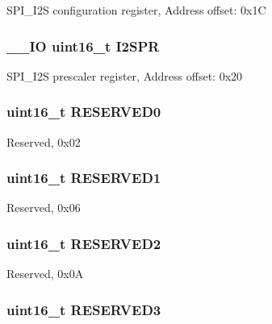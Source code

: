 S\-P\-I\-\_\-\-I2\-S configuration register, Address offset\-: 0x1\-C \hypertarget{struct_s_p_i___type_def_a02ce1ece243cc4ce1d66ebeca247fee1}{
\subsubsection[{I2\-S\-P\-R}]{\setlength{\rightskip}{0pt plus 5cm}\-\_\-\-\_\-\-I\-O uint16\-\_\-t I2\-S\-P\-R}}\label{struct_s_p_i___type_def_a02ce1ece243cc4ce1d66ebeca247fee1}
S\-P\-I\-\_\-\-I2\-S prescaler register, Address offset\-: 0x20 \hypertarget{struct_s_p_i___type_def_a149feba01f9c4a49570c6d88619f504f}{
\subsubsection[{R\-E\-S\-E\-R\-V\-E\-D0}]{\setlength{\rightskip}{0pt plus 5cm}uint16\-\_\-t R\-E\-S\-E\-R\-V\-E\-D0}}\label{struct_s_p_i___type_def_a149feba01f9c4a49570c6d88619f504f}
Reserved, 0x02 \hypertarget{struct_s_p_i___type_def_a8249a3955aace28d92109b391311eb30}{
\subsubsection[{R\-E\-S\-E\-R\-V\-E\-D1}]{\setlength{\rightskip}{0pt plus 5cm}uint16\-\_\-t R\-E\-S\-E\-R\-V\-E\-D1}}\label{struct_s_p_i___type_def_a8249a3955aace28d92109b391311eb30}
Reserved, 0x06 \hypertarget{struct_s_p_i___type_def_a5573848497a716a9947fd87487709feb}{
\subsubsection[{R\-E\-S\-E\-R\-V\-E\-D2}]{\setlength{\rightskip}{0pt plus 5cm}uint16\-\_\-t R\-E\-S\-E\-R\-V\-E\-D2}}\label{struct_s_p_i___type_def_a5573848497a716a9947fd87487709feb}
Reserved, 0x0\-A \hypertarget{struct_s_p_i___type_def_a6c3b31022e6f59b800e9f5cc2a89d54c}{
\subsubsection[{R\-E\-S\-E\-R\-V\-E\-D3}]{\setlength{\rightskip}{0pt plus 5cm}uint16\-\_\-t R\-E\-S\-E\-R\-V\-E\-D3}}\label{struct_s_p_i___type_def_a6c3b31022e6f59b800e9f5cc2a89d54c}
